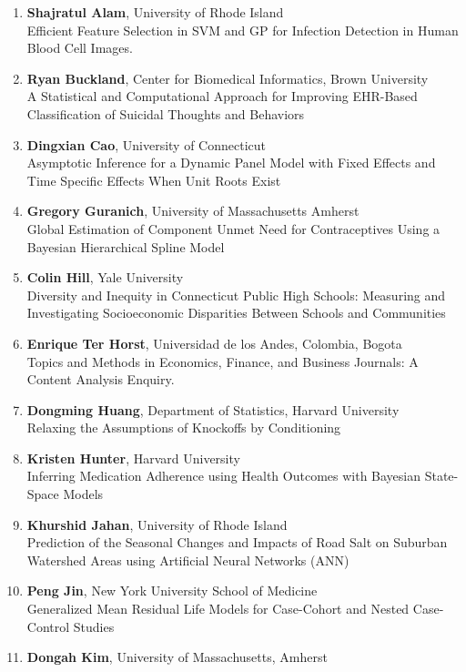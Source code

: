
\begin{enumerate}
\item \textbf{Shajratul Alam}, University of Rhode Island \\
Efficient Feature Selection in SVM and GP for Infection Detection in Human Blood Cell Images.
\item \textbf{Ryan Buckland}, Center for Biomedical Informatics, Brown University \\
A Statistical and Computational Approach for Improving EHR-Based Classification of Suicidal Thoughts and Behaviors
\item \textbf{Dingxian Cao}, University of Connecticut \\
Asymptotic Inference for a Dynamic Panel Model with Fixed Effects and Time Specific Effects When Unit Roots Exist
\item \textbf{Gregory Guranich}, University of Massachusetts Amherst \\
Global Estimation of Component Unmet Need for Contraceptives Using a Bayesian Hierarchical Spline Model
\item \textbf{Colin Hill}, Yale University \\
Diversity and Inequity in Connecticut Public High Schools: Measuring and Investigating Socioeconomic Disparities Between Schools and Communities
\item \textbf{Enrique Ter Horst}, Universidad de los Andes, Colombia, Bogota \\
Topics and Methods in Economics, Finance, and Business Journals: A Content Analysis Enquiry.
\item \textbf{Dongming Huang}, Department of Statistics, Harvard University \\
Relaxing the Assumptions of Knockoffs by Conditioning
\item \textbf{Kristen Hunter}, Harvard University \\
Inferring Medication Adherence using Health Outcomes with Bayesian State-Space Models
\item \textbf{Khurshid Jahan}, University of Rhode Island \\
Prediction of the Seasonal Changes and Impacts of Road Salt on Suburban Watershed Areas using Artificial Neural Networks (ANN)
\item \textbf{Peng Jin}, New York University School of Medicine \\
Generalized Mean Residual Life Models for Case-Cohort and Nested Case-Control Studies
\item \textbf{Dongah Kim}, University of Massachusetts, Amherst \\

\end{enumerate}
